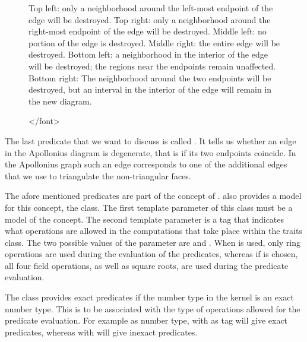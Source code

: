 \begin{figure}[!t]
{%
  Top left: only a neighborhood around
  the left-most endpoint of the edge will be destroyed. Top right:
  only a neighborhood around the right-most endpoint of the edge will
  be destroyed. Middle left: no portion of the edge is destroyed.
  Middle right: the entire edge will be destroyed. Bottom left: a
  neighborhood in the interior of the edge
  will be destroyed; the regions near the endpoints remain
  unaffected. Bottom right: The neighborhood around the two endpoints
  will be destroyed, but an interval in the interior of the edge will
  remain in the new diagram.}\label{fig-ag2edgeconflict}
\begin{ccHtmlOnly}
</font>
\end{ccHtmlOnly}
\end{figure}

The last predicate that we want to discuss is called
. It tells us whether an edge in the
Apollonius diagram is degenerate, that is if its two endpoints
coincide. In the Apollonius graph such an edge corresponds to one of
the additional edges that we use to triangulate the non-triangular
faces.

The afore mentioned predicates are part of the
 concept of \cgal. \cgal{} also provides
a model for this concept, the
 class. The first
template parameter of this class must be a model of the 
concept. The second template parameter is a tag that indicates what
operations are allowed in the computations that take place within the
traits class.
The two possible values of the  parameter are
 and . When
 is used, only ring operations are used during the
evaluation of the predicates, whereas if  is
chosen, all four field operations, as well as square roots, are used
during the predicate evaluation.

The  class provides exact
predicates if the number type in the kernel  is an exact number
type. This is to be associated with the type of operations allowed for
the predicate evaluation. For example  as number
type, with  as tag will give exact predicates,
whereas  with  will give
inexact predicates.

